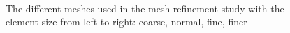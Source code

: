 \begin{figure}[h]
\begin{subfigure}{0.24\textwidth}
          \end{subfigure}\hfill
        \begin{subfigure}{0.24\textwidth}
                \flushright
        \end{subfigure}
        \\
        
        \caption[Mesh refinement study]{The different meshes used in the mesh refinement study with the element-size from left to right: coarse, normal, fine, finer}
        \label{fig:Mesh_Ref}
  \end{figure}
 

